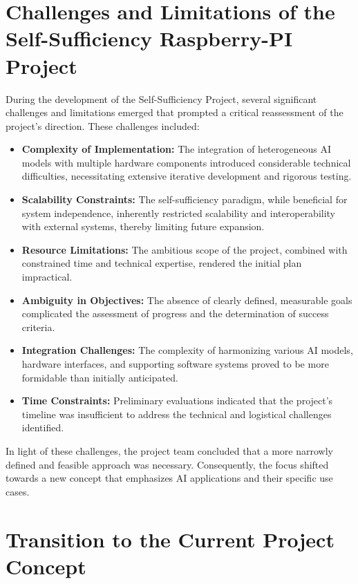 \cite{SAIPIA-Concept}

\section{Challenges and Limitations of the Self-Sufficiency Raspberry-PI Project}

During the development of the Self-Sufficiency Project, several significant challenges and limitations emerged that prompted a critical reassessment of the project’s direction. These challenges included:
\begin{itemize}
    \item \textbf{Complexity of Implementation:} The integration of heterogeneous AI models with multiple hardware components introduced considerable technical difficulties, necessitating extensive iterative development and rigorous testing.
    \item \textbf{Scalability Constraints:} The self-sufficiency paradigm, while beneficial for system independence, inherently restricted scalability and interoperability with external systems, thereby limiting future expansion.
    \item \textbf{Resource Limitations:} The ambitious scope of the project, combined with constrained time and technical expertise, rendered the initial plan impractical.
    \item \textbf{Ambiguity in Objectives:} The absence of clearly defined, measurable goals complicated the assessment of progress and the determination of success criteria.
    \item \textbf{Integration Challenges:} The complexity of harmonizing various AI models, hardware interfaces, and supporting software systems proved to be more formidable than initially anticipated.
    \item \textbf{Time Constraints:} Preliminary evaluations indicated that the project’s timeline was insufficient to address the technical and logistical challenges identified.
\end{itemize}

In light of these challenges, the project team concluded that a more narrowly defined and feasible approach was necessary. Consequently, the focus shifted towards a new concept that emphasizes AI applications and their specific use cases.

\section{Transition to the Current Project Concept}

